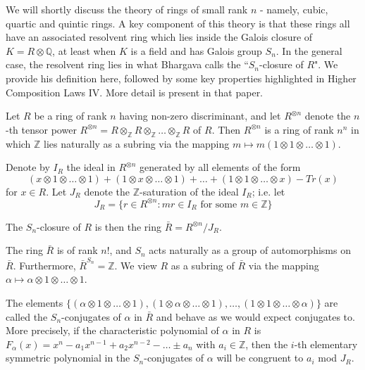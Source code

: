 \documentclass{report}
\begin{document}
We will shortly discuss the theory of rings of small rank $n$ - namely, cubic, quartic and quintic rings.  A key component of this theory is that these rings all have an associated resolvent ring which lies inside the Galois closure of $K = R \otimes \mathbb{Q}$, at least when $K$ is a field and has Galois group $S_n$.  In the general case, the resolvent ring lies in what Bhargava calls the ``$S_n$-closure of $R$".  We provide his definition here, followed by some key properties highlighted in Higher Composition Laws IV.  More detail is present in that paper.

\begin{definition} \label{Sn closure}
Let $R$ be a ring of rank $n$ having non-zero discriminant, and let $R^{\otimes n}$ denote the $n$-th tensor power $R^{\otimes n} = R \otimes_\mathbb{Z} R \otimes_\mathbb{Z} \ldots \otimes_\mathbb{Z} R$ of $R$.  Then $R^{\otimes n}$ is a ring of rank $n^n$ in which $\mathbb{Z}$ lies naturally as a subring via the mapping $m \mapsto m(1 \otimes 1 \otimes \ldots \otimes 1)$.

Denote by $I_R$ the ideal in $R^{\otimes n}$ generated by all elements of the form
\begin{equation}
(x \otimes 1 \otimes \ldots \otimes 1) + (1 \otimes x \otimes \ldots \otimes 1) + \ldots + (1 \otimes 1 \otimes \ldots \otimes x) - Tr(x)
\end{equation}
for $x \in R$.  Let $J_R$ denote the $\mathbb{Z}$-saturation of the ideal $I_R$; i.e. let
\begin{equation}
J_R = \{r \in R^{\otimes n} : mr \in I_R \text{ for some } m \in \mathbb{Z} \}
\end{equation}

The $S_n$-closure of $R$ is then the ring $\bar{R} = R^{\otimes n} / J_R$.
\end{definition}

The ring $\bar{R}$ is of rank $n!$, and $S_n$ acts naturally as a group of automorphisms on $\bar{R}$.  Furthermore, $\bar{R}^{S_n} = \mathbb{Z}$.  We view $R$ as a subring of $\bar{R}$ via the mapping $\alpha \mapsto \alpha \otimes 1 \otimes \ldots \otimes 1$.

The elements $\{(\alpha \otimes 1 \otimes \ldots \otimes 1), (1 \otimes \alpha \otimes \ldots \otimes 1), \ldots, (1 \otimes 1 \otimes \ldots \otimes \alpha)\}$ are called the $S_n$-conjugates of $\alpha$ in $\bar{R}$ and behave as we would expect conjugates to.  More precisely, if the characteristic polynomial of $\alpha$ in $R$ is $F_\alpha(x) = x^n - a_1 x^{n-1} + a_2 x^{n-2} - \ldots \pm a_n$ with $a_i \in \mathbb{Z}$, then the $i$-th elementary symmetric polynomial in the $S_n$-conjugates of $\alpha$ will be congruent to $a_i$ mod $J_R$.
\end{document}
